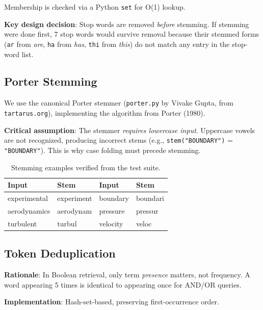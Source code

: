\documentclass[12pt,a4paper]{article}
\begin{document}
Membership is checked via a Python \texttt{set} for O(1) lookup.

\textbf{Key design decision}: Stop words are removed \textit{before} stemming.
If stemming were done first, 7 stop words would survive removal because their
stemmed forms (\texttt{ar} from \textit{are}, \texttt{ha} from \textit{has},
\texttt{thi} from \textit{this}) do not match any entry in the stop-word list.

\subsection{Porter Stemming}
\label{sec:stemming}

We use the canonical Porter stemmer (\texttt{porter.py} by Vivake Gupta, from
\texttt{tartarus.org}), implementing the algorithm from Porter (1980).

\textbf{Critical assumption}: The stemmer \textit{requires lowercase input}.
Uppercase vowels are not recognized, producing incorrect stems
(e.g., \texttt{stem("BOUNDARY")} = \texttt{"BOUNDARY"}).
This is why case folding must precede stemming.

\begin{table}[H]
\centering\small
\caption{Stemming examples verified from the test suite.}
\begin{tabular}{@{}llll@{}}
\toprule
\textbf{Input} & \textbf{Stem} & \textbf{Input} & \textbf{Stem} \\
\midrule
experimental & experiment & boundary & boundari \\
aerodynamics & aerodynam & pressure & pressur \\
turbulent & turbul & velocity & veloc \\
\bottomrule
\end{tabular}
\end{table}

\subsection{Token Deduplication}
\label{sec:dedup}

\textbf{Rationale}: In Boolean retrieval, only term \textit{presence} matters,
not frequency.  A word appearing 5 times is identical to appearing once for
AND/OR queries.

\textbf{Implementation}: Hash-set-based, preserving first-occurrence order.
\end{document}
